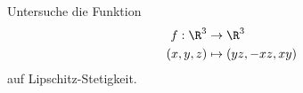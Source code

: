 \begin{prob}
Untersuche die Funktion
\begin{equation*}
        \begin{split}
            f:\R^3&\to\R^3\\
            (x,y,z)&\mapsto (yz, -xz, xy)
        \end{split}
    \end{equation*}
 auf Lipschitz-Stetigkeit.
\end{prob}
